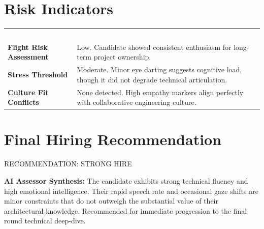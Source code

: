 \documentclass[11pt,a4paper]{article}
\begin{document}
\section{Risk Indicators}
\renewcommand{\arraystretch}{1.5}
\begin{tabularx}{\textwidth}{@{} >{\bfseries}p{4cm} X @{}}
  \rowcolor{WiseThemeBg}
  \textcolor{white}{\textbf{Risk Factor}} & \textcolor{white}{\textbf{Assessment \& Justification}} \\
  \rowcolor{WiseLight}
  Flight Risk Assessment & Low. Candidate showed consistent enthusiasm for long-term project ownership.\vspace{0.2em} \\
  Stress Threshold & Moderate. Minor eye darting suggests cognitive load, though it did not degrade technical articulation.\vspace{0.2em} \\
  \rowcolor{WiseLight}
  Culture Fit Conflicts & None detected. High empathy markers align perfectly with collaborative engineering culture. \\
  \bottomrule
\end{tabularx}

\section{Final Hiring Recommendation}
\begin{tcolorbox}[colframe=WiseThemeBg, colback=WiseThemeBg, text=white, fontupper=\large\bfseries, center, boxrule=0pt, arc=4pt, toptitle=1.5ex, bottomtitle=1.5ex]
  RECOMMENDATION: STRONG HIRE
\end{tcolorbox}
\vspace{0.2em}
\noindent
\textbf{AI Assessor Synthesis:} The candidate exhibits strong technical fluency and high emotional intelligence. Their rapid speech rate and occasional gaze shifts are minor constraints that do not outweigh the substantial value of their architectural knowledge. Recommended for immediate progression to the final round technical deep-dive.

\newpage
\end{document}
